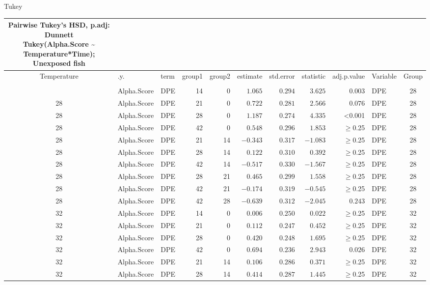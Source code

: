\documentclass[
]{article}
\begin{document}
Tukey

\begin{longtable}{cllrrrrrrlc}
\caption*{
{\large Pairwise Tukey's HSD, p.adj: Dunnett} \\ 
{\small Tukey(Alpha.Score \textasciitilde{} Temperature*Time); Unexposed fish}
} \\ 
\toprule
Temperature & .y. & term & group1 & group2 & estimate & std.error & statistic & adj.p.value & Variable & Group \\ 
\midrule\addlinespace[2.5pt]
\multicolumn{11}{l}{Shannon} \\ 
\midrule\addlinespace[2.5pt]
28 & Alpha.Score & DPE & 14 & 0 & $1.065$ & $0.294$ & $3.625$ & $0.003$ & DPE & 28 \\ 
28 & Alpha.Score & DPE & 21 & 0 & $0.722$ & $0.281$ & $2.566$ & $0.076$ & DPE & 28 \\ 
28 & Alpha.Score & DPE & 28 & 0 & $1.187$ & $0.274$ & $4.335$ & <0.001 & DPE & 28 \\ 
28 & Alpha.Score & DPE & 42 & 0 & $0.548$ & $0.296$ & $1.853$ & $\geq$0.25 & DPE & 28 \\ 
28 & Alpha.Score & DPE & 21 & 14 & $-0.343$ & $0.317$ & $-1.083$ & $\geq$0.25 & DPE & 28 \\ 
28 & Alpha.Score & DPE & 28 & 14 & $0.122$ & $0.310$ & $0.392$ & $\geq$0.25 & DPE & 28 \\ 
28 & Alpha.Score & DPE & 42 & 14 & $-0.517$ & $0.330$ & $-1.567$ & $\geq$0.25 & DPE & 28 \\ 
28 & Alpha.Score & DPE & 28 & 21 & $0.465$ & $0.299$ & $1.558$ & $\geq$0.25 & DPE & 28 \\ 
28 & Alpha.Score & DPE & 42 & 21 & $-0.174$ & $0.319$ & $-0.545$ & $\geq$0.25 & DPE & 28 \\ 
28 & Alpha.Score & DPE & 42 & 28 & $-0.639$ & $0.312$ & $-2.045$ & $0.243$ & DPE & 28 \\ 
32 & Alpha.Score & DPE & 14 & 0 & $0.006$ & $0.250$ & $0.022$ & $\geq$0.25 & DPE & 32 \\ 
32 & Alpha.Score & DPE & 21 & 0 & $0.112$ & $0.247$ & $0.452$ & $\geq$0.25 & DPE & 32 \\ 
32 & Alpha.Score & DPE & 28 & 0 & $0.420$ & $0.248$ & $1.695$ & $\geq$0.25 & DPE & 32 \\ 
32 & Alpha.Score & DPE & 42 & 0 & $0.694$ & $0.236$ & $2.943$ & $0.026$ & DPE & 32 \\ 
32 & Alpha.Score & DPE & 21 & 14 & $0.106$ & $0.286$ & $0.371$ & $\geq$0.25 & DPE & 32 \\ 
32 & Alpha.Score & DPE & 28 & 14 & $0.414$ & $0.287$ & $1.445$ & $\geq$0.25 & DPE & 32 \\ 

\end{longtable}
\end{document}

